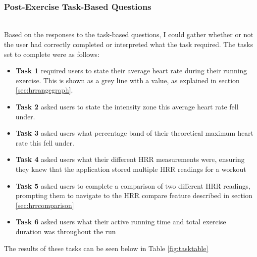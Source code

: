 \documentclass{l4proj}
\begin{document}
\noindent\mbox{}\\
\subsubsection{Post-Exercise Task-Based Questions}
\noindent\mbox{}\\

Based on the responses to the task-based questions, I could gather whether or not the user had correctly completed or interpreted what the task required. The tasks set to complete were as follows:

\begin{itemize}
    \item \textbf{Task 1} required users to state their average heart rate during their running exercise. This is shown as a grey line with a value, as explained in section \ref{sec:hrrangegraph}.
    \item \textbf{Task 2} asked users to state the intensity zone this average heart rate fell under.
    \item \textbf{Task 3} asked users what percentage band of their theoretical maximum heart rate this fell under.
    \item \textbf{Task 4} asked users what their different HRR measurements were, ensuring they knew that the application stored multiple HRR readings for a workout
    \item \textbf{Task 5} asked users to complete a comparison of two different HRR readings, prompting them to navigate to the HRR compare feature described in section \ref{sec:hrrcomparison}
    \item \textbf{Task 6} asked users what their active running time and total exercise duration was throughout the run
\end{itemize}

The results of these tasks can be seen below in Table \ref{fig:tasktable}
\end{document}
